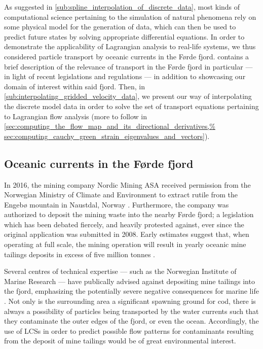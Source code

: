 As suggested in \cref{sub:spline_interpolation_of_discrete_data}, most kinds of
computational science pertaining to the simulation of natural phenomena rely on
some physical model for the generation of data, which can then be used to
predict future states by solving appropriate differential equations. In order
to demonstrate the applicability of Lagrangian analysis to real-life systems,
we thus considered particle transport by oceanic currents in the Førde fjord.
 contains a brief description of
the relevance of transport in the Førde fjord in particular --- in light of
recent legislations and regulations --- in addition to showcasing our domain of
interest within said fjord. Then, in
\cref{sub:interpolating_gridded_velocity_data}, we present our way of
interpolating the discrete model data in order to solve the set of transport
equations pertaining to Lagrangian flow analysis (more to follow in
\cref{sec:computing_the_flow_map_and_its_directional_derivatives,%
sec:computing_cauchy_green_strain_eigenvalues_and_vectors}).

\subsection{Oceanic currents in the Førde fjord}
\label{sub:oceanic_currents_in_the_forde_fjord}

In 2016, the mining company Nordic Mining ASA received permission from the
Norwegian Ministry of Climate and Environment to extract rutile from the
Engebø mountain in Naustdal, Norway \parencite{garvik2017gruvekonflikten,%
haugan2015sjodeponi}. Furthermore, the company was authorized to deposit
the mining waste into the nearby Førde fjord; a legislation which has been
debated fiercely, and heavily protested against, ever since the original
application was submitted in 2008. Early estimates suggest that, when operating
at full scale, the mining operation will result in yearly oceanic mine tailings
deposits in excess of five million tonnes \parencite{garvik2017gruvekonflikten}.

Several centres of technical expertise --- such as the Norwegian Institute of
Marine Research --- have publically advised against depositing mine tailings
into the fjord, emphasizing the potentially severe negative consequences
for marine life \parencite{haugan2015sjodeponi}. Not only is the surrounding
area a significant spawning ground for cod, there is always a possibility of
particles being transported by the water currents such that they contaminate
the outer edges of the fjord, or even the ocean. Accordingly, the use of
LCSs in order to predict possible flow patterns for contaminants resulting from
the deposit of mine tailings would be of great environmental interest.

